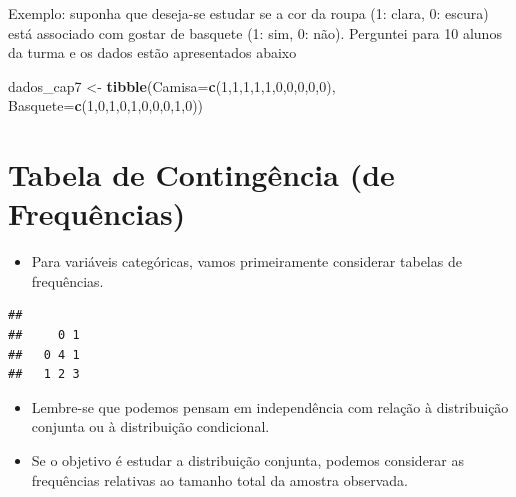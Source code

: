 \documentclass[
]{book}
\newenvironment{Shaded}{\begin{snugshade}}{\end{snugshade}}
\newcommand{\AttributeTok}[1]{\textcolor[rgb]{0.13,0.29,0.53}{#1}}
\newcommand{\CommentTok}[1]{\textcolor[rgb]{0.56,0.35,0.01}{\textit{#1}}}
\newcommand{\DecValTok}[1]{\textcolor[rgb]{0.00,0.00,0.81}{#1}}
\newcommand{\FunctionTok}[1]{\textcolor[rgb]{0.13,0.29,0.53}{\textbf{#1}}}
\newcommand{\NormalTok}[1]{#1}
\newcommand{\OtherTok}[1]{\textcolor[rgb]{0.56,0.35,0.01}{#1}}
\newcommand{\SpecialCharTok}[1]{\textcolor[rgb]{0.81,0.36,0.00}{\textbf{#1}}}
\providecommand{\tightlist}{%
  \setlength{\itemsep}{0pt}\setlength{\parskip}{0pt}}
\begin{document}
Exemplo: suponha que deseja-se estudar se a cor da roupa (1: clara, 0: escura) está associado com gostar de basquete (1: sim, 0: não). Perguntei para 10 alunos da turma e os dados estão apresentados abaixo

\begin{Shaded}
\begin{Highlighting}[]
\NormalTok{dados\_cap7 }\OtherTok{\textless{}{-}} \FunctionTok{tibble}\NormalTok{(}\AttributeTok{Camisa=}\FunctionTok{c}\NormalTok{(}\DecValTok{1}\NormalTok{,}\DecValTok{1}\NormalTok{,}\DecValTok{1}\NormalTok{,}\DecValTok{1}\NormalTok{,}\DecValTok{1}\NormalTok{,}\DecValTok{0}\NormalTok{,}\DecValTok{0}\NormalTok{,}\DecValTok{0}\NormalTok{,}\DecValTok{0}\NormalTok{,}\DecValTok{0}\NormalTok{),}
                \AttributeTok{Basquete=}\FunctionTok{c}\NormalTok{(}\DecValTok{1}\NormalTok{,}\DecValTok{0}\NormalTok{,}\DecValTok{1}\NormalTok{,}\DecValTok{0}\NormalTok{,}\DecValTok{1}\NormalTok{,}\DecValTok{0}\NormalTok{,}\DecValTok{0}\NormalTok{,}\DecValTok{0}\NormalTok{,}\DecValTok{1}\NormalTok{,}\DecValTok{0}\NormalTok{))}
\end{Highlighting}
\end{Shaded}

\section{Tabela de Contingência (de Frequências)}\label{tabela-de-continguxeancia-de-frequuxeancias}

\begin{itemize}
\tightlist
\item
  Para variáveis categóricas, vamos primeiramente considerar tabelas de frequências.
\end{itemize}

\begin{Shaded}
\end{Shaded}

\begin{verbatim}
##    
##     0 1
##   0 4 1
##   1 2 3
\end{verbatim}

\begin{itemize}
\item
  Lembre-se que podemos pensam em independência com relação à distribuição conjunta ou à distribuição condicional.
\item
  Se o objetivo é estudar a distribuição conjunta, podemos considerar as frequências relativas ao tamanho total da amostra observada.
\end{itemize}
\end{document}
